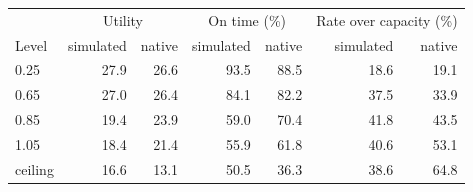 \begin{tabular}{lrrrrrr}
\toprule
 & \multicolumn{2}{c}{Utility} & \multicolumn{2}{c}{On time (\%)} & \multicolumn{2}{c}{Rate over capacity (\%)} \\
Level & simulated & native & simulated & native & simulated & native \\
\midrule
0.25 & 27.9 & 26.6 & 93.5 & 88.5 & 18.6 & 19.1 \\
0.65 & 27.0 & 26.4 & 84.1 & 82.2 & 37.5 & 33.9 \\
0.85 & 19.4 & 23.9 & 59.0 & 70.4 & 41.8 & 43.5 \\
1.05 & 18.4 & 21.4 & 55.9 & 61.8 & 40.6 & 53.1 \\
ceiling & 16.6 & 13.1 & 50.5 & 36.3 & 38.6 & 64.8 \\
\bottomrule
\end{tabular}
